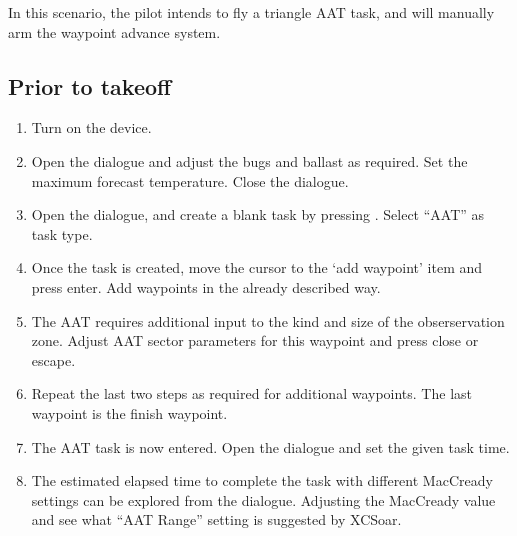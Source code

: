 In this scenario, the pilot intends to fly a triangle AAT task, and
will manually arm the waypoint advance system.

\subsection*{Prior to takeoff}
\begin{enumerate}
\item  Turn on the device.
\item  Open the  dialogue and adjust the bugs and ballast as
  required. Set the maximum forecast temperature.  Close the dialogue.
\item Open the  dialogue, and create a blank task by pressing
. Select ``AAT'' as task type.
\item  Once the task is created, move the cursor to the `add waypoint' item
  and press enter.  Add waypoints in the already described way.
\item  The AAT requires additional input to the kind and size of the
  obserservation zone. Adjust AAT sector parameters for this waypoint and press
  close or escape.
\item  Repeat the last two steps as required for additional waypoints.  The last
  waypoint is the finish waypoint.
\item  The AAT task is now entered.  Open the  dialogue
  and set the given task time.
\item  The estimated elapsed time to complete the task with different MacCready
  settings can be explored from the  dialogue.  Adjusting the
  MacCready value and see what ``AAT Range'' setting is suggested by XCSoar.
\end{enumerate}

